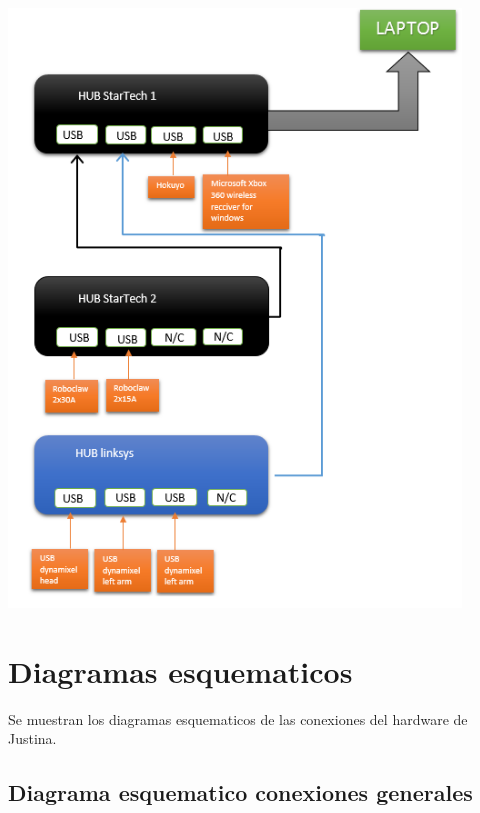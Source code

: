 \documentclass[a4paper,usenames,dvipsnames,svgnames,table]{book}
\begin{document}
\begin{center}
\includegraphics[width=0.9\textwidth]{Figures/Hardware/Diagramas/HUB.png}
\label{fig:Hardware:Diagramas:Justina:HUBs}
\end{center}



\section{Diagramas esquematicos}
Se muestran los diagramas esquematicos de las conexiones del hardware de Justina.


\subsection{Diagrama esquematico conexiones generales}
\end{document}
